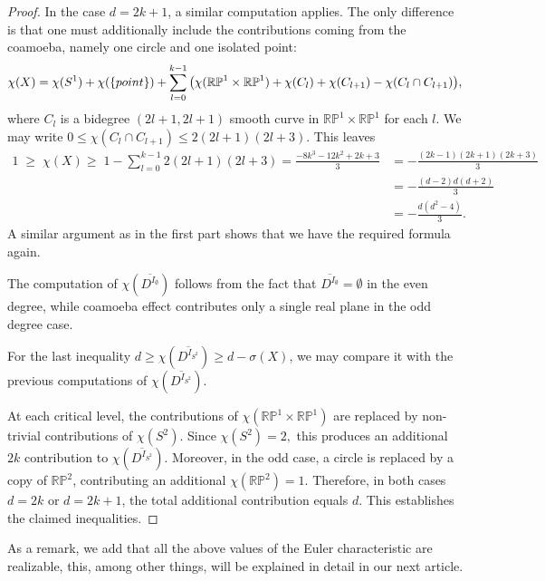 \documentclass[pdflatex,sn-mathphys-num]{sn-jnl}%
\theoremstyle{thmstyleone}%
\theoremstyle{thmstyletwo}%
\theoremstyle{thmstylethree}%
\newcommand{\RP}{\mathbb{R}\mathbb{P}}
\begin{document}
\begin{proof}
	In the case  $d=2k+1$, a similar computation applies. The only difference is that one must additionally include the contributions coming from the coamoeba, namely one circle and one isolated point:
	$$\chi(X)=\chi(S^1)+\chi({\text\{point\}})+\sum_{l=0}^{k-1}\big(\chi(\mathbb{RP}^1\times\mathbb{RP}^1)+\chi(C_l)+\chi(C_{l+1})-\chi(C_l\cap C_{l+1})\big),$$
	where $C_l$ is a bidegree $(2l+1,2l+1)$ smooth curve in $\mathbb{RP}^1\times\mathbb{RP}^1$ for each $l$. We may write $0\leq\chi(C_l\cap C_{l+1})\leq 2(2l+1)(2l+3)$. This leaves 
	\begin{align*}
		1 \;\geq\; \chi(X)\geq\;
		1-\sum_{l=0}^{k-1} 2(2l+1)(2l+3)=\frac{-8k^3-12k^2+2k+3}{3}&=-\frac{(2k-1)(2k+1)(2k+3)}{3} \\
		&=-\frac{(d-2)d(d+2)}{3} \\
		&=-\frac{d(d^2-4)}{3}.
	\end{align*}	A similar argument as in the first part shows that we have the required formula again.
	
	The computation of $\chi(\overline{D^{I_{\emptyset}}})$ follows from the fact that $\overline{D^{I_{\emptyset}}}=\emptyset$ in the even degree, while coamoeba effect contributes only a single real plane in the odd degree case.
	
	For the last inequality $d\geq\chi(\overline{D^{I_{S^2}}})\geq d-\sigma(X)$, we may compare it with the previous computations of $\chi(\overline{D^{I_{S^2}}})$.
	
	At each critical level, the contributions of $\chi(\RP^1\times\RP^1)$ are replaced by non-trivial contributions of $\chi(S^2)$. Since $\chi(S^2)=2,$ this produces an additional  $2k$ contribution to $\chi(\overline{D^{I_{S^2}}})$. Moreover, in the odd case, a circle is replaced by a copy of $\RP^2$, contributing an additional  $\chi(\RP^2)=1$. Therefore, in both cases  $d=2k$ or $d=2k+1$, the total additional contribution equals $d$. This establishes the claimed inequalities.
	
\end{proof}

As a remark, we add that all the above values of the Euler characteristic are realizable, this, among other things, will be explained in detail in our next article. 
\end{document}
